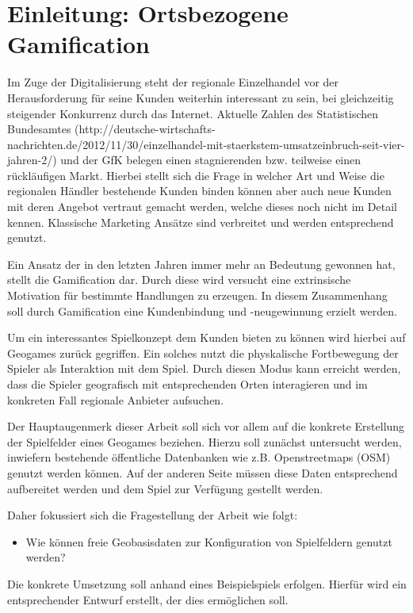 \chapter{Einleitung: Ortsbezogene Gamification}
\label{ch1:S1_Einleitung}

Im Zuge der Digitalisierung steht der regionale Einzelhandel vor der Herausforderung für seine Kunden weiterhin interessant zu sein, bei gleichzeitig steigender Konkurrenz durch das Internet. Aktuelle Zahlen des Statistischen Bundesamtes (http://deutsche-wirtschafts-nachrichten.de/2012/11/30/einzelhandel-mit-staerkstem-umsatzeinbruch-seit-vier-jahren-2/) und der GfK belegen einen stagnierenden bzw. teilweise einen rückläufigen Markt.
Hierbei stellt sich die Frage in welcher Art und Weise die regionalen Händler bestehende Kunden binden können aber auch neue Kunden mit deren Angebot vertraut gemacht werden, welche dieses noch nicht im Detail kennen.
Klassische Marketing Ansätze sind verbreitet und werden entsprechend genutzt.

Ein Ansatz der in den letzten Jahren immer mehr an Bedeutung gewonnen hat, stellt die Gamification dar. Durch diese wird versucht eine extrinsische Motivation für bestimmte Handlungen zu erzeugen. In diesem Zusammenhang soll durch Gamification eine Kundenbindung und -neugewinnung erzielt werden.

Um ein interessantes Spielkonzept dem Kunden bieten zu können wird hierbei auf Geogames zurück gegriffen.
Ein solches nutzt die physkalische Fortbewegung der Spieler als Interaktion mit dem Spiel.
Durch diesen Modus kann erreicht werden, dass die Spieler geografisch mit entsprechenden Orten interagieren und im konkreten Fall regionale Anbieter aufsuchen.

Der Hauptaugenmerk dieser Arbeit soll sich vor allem auf die konkrete Erstellung der Spielfelder eines Geogames beziehen. Hierzu soll zunächst untersucht werden, inwiefern bestehende öffentliche Datenbanken wie z.B. Openstreetmaps (OSM) genutzt werden können. Auf der anderen Seite müssen diese Daten entsprechend aufbereitet werden und dem Spiel zur Verfügung gestellt werden.

Daher fokussiert sich die Fragestellung der Arbeit wie folgt:
\begin{itemize}
  \item Wie können freie Geobasisdaten zur Konfiguration von Spielfeldern genutzt werden?
\end{itemize}

Die konkrete Umsetzung soll anhand eines Beispielspiels erfolgen.
Hierfür wird ein entsprechender Entwurf erstellt, der dies ermöglichen soll.

